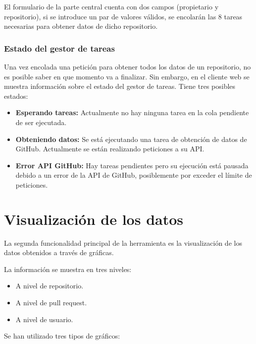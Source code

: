 El formulario de la parte central cuenta con dos campos (propietario y repositorio), si se introduce un par de valores válidos, se encolarán las 8 tareas necesarias para obtener datos de dicho repositorio.


\subsubsection{Estado del gestor de tareas}

Una vez encolada una petición para obtener todos los datos de un repositorio, no es posible saber en que momento va a finalizar. Sin embargo, en el cliente web se muestra información sobre el estado del gestor de tareas. Tiene tres posibles estados:

\begin{itemize}
\tightlist
	\item \textbf{Esperando tareas:} Actualmente no hay ninguna tarea en la cola pendiente de ser ejecutada.
	\item \textbf{Obteniendo datos:} Se está ejecutando una tarea de obtención de datos de GitHub. Actualmente se están realizando peticiones a su API.
	\item \textbf{Error API GitHub:} Hay tareas pendientes pero su ejecución está pausada debido a un error de la API de GitHub, posiblemente por exceder el límite de peticiones.
\end{itemize}


\section{Visualización de los datos}

La segunda funcionalidad principal de la herramienta es la visualización de los datos obtenidos a través de gráficas.

La información se muestra en tres niveles:

\begin{itemize}
	\item A nivel de repositorio.
	\item A nivel de pull request.
	\item A nivel de usuario.
\end{itemize}

Se han utilizado tres tipos de gráficos:


